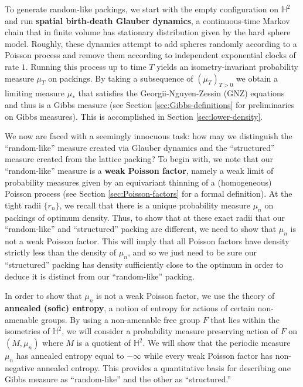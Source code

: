 \documentclass[11pt]{amsart}
\theoremstyle{definition}
\theoremstyle{remark}
\renewcommand{\H}{\mathbb{H}}
\begin{document}
To generate  random-like packings, we start with the empty configuration on $\H^2$ and run \textbf{spatial birth-death Glauber dynamics}, a continuous-time Markov chain that in finite volume has stationary distribution given by the hard sphere model.  Roughly, these dynamics attempt to add spheres randomly according to a Poisson process and remove them according to independent exponential clocks of rate $1$.   Running this process up to time $T$ yields an isometry-invariant probability measure $\mu_T$ on packings.  By taking a subsequence of $(\mu_T)_{T > 0}$ we obtain a limiting measure $\mu_\ast$ that satisfies the Georgii-Nguyen-Zessin (GNZ) equations and thus is a Gibbs measure (see Section \ref{sec:Gibbs-definitions} for preliminaries on Gibbs measures).  This is accomplished in Section \ref{sec:lower-density}. 

We now are faced with a seemingly innocuous task: how may we distinguish the ``random-like'' measure created via Glauber dynamics and the ``structured'' measure created from the lattice packing?  To begin with, we note that our ``random-like'' measure is a \textbf{weak Poisson factor}, namely a weak limit of probability measures given by an equivariant thinning of a (homogeneous) Poisson process (see Section \ref{sec:Poisson-factors} for a formal definition).  At the tight radii $\{r_n\}$, we recall that there is a unique probability measure $\mu_n$ on packings of optimum density.  Thus, to show that at these exact radii that  our ``random-like'' and ``structured'' packing are different, we  need to show that $\mu_n$ is not a weak Poisson factor. This will imply that all Poisson factors have density strictly less than the density of $\mu_n$, and so we just need to be sure our ``structured'' packing has density sufficiently close to the optimum in order to deduce it is distinct from our ``random-like'' packing.

In order to show that $\mu_n$ is not a weak Poisson factor, we use the theory of \textbf{annealed (sofic) entropy}, a notion of entropy for actions of certain non-amenable groups.  By using a non-amenable free group $F$ that lies within the isometries of $\H^2$, we will consider a probability measure preserving action of $F$ on $(M,\mu_n)$ where $M$ is a quotient of $\H^2$.  We will show that the periodic measure $\mu_n$ has annealed entropy equal to $-\infty$ while every weak Poisson factor has non-negative annealed entropy.  
This provides a quantitative basis for describing one Gibbs measure as ``random-like'' and the other as ``structured.''  
\end{document}
